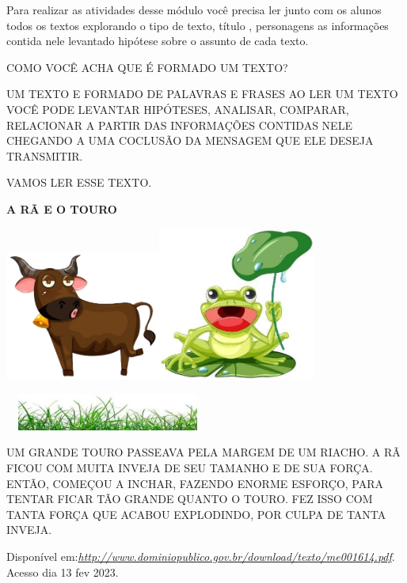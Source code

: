 \begin{escola}
Para realizar as atividades desse módulo você precisa ler junto com os
alunos todos os textos explorando o tipo de texto, título , personagens
as informações contida nele levantado hipótese sobre o assunto de cada
texto.

COMO VOCÊ ACHA QUE É FORMADO UM TEXTO?

UM TEXTO E FORMADO DE PALAVRAS E FRASES AO LER UM TEXTO VOCÊ PODE
LEVANTAR HIPÓTESES, ANALISAR, COMPARAR, RELACIONAR A PARTIR DAS
INFORMAÇÕES CONTIDAS NELE CHEGANDO A UMA COCLUSÃO DA MENSAGEM QUE ELE
DESEJA TRANSMITIR.

VAMOS LER ESSE TEXTO.

\textbf{A RÃ E O TOURO}

\includegraphics[width=2.01214in,height=1.68750in]{media/image160.png}\includegraphics[width=2.04167in,height=1.99274in]{media/image161.jpg}

\includegraphics[width=2.66528in,height=0.47292in]{media/image162.jpg}

UM GRANDE TOURO PASSEAVA PELA MARGEM DE UM RIACHO. A RÃ FICOU COM MUITA
INVEJA DE SEU TAMANHO E DE SUA FORÇA. ENTÃO, COMEÇOU A INCHAR, FAZENDO
ENORME ESFORÇO, PARA TENTAR FICAR TÃO GRANDE QUANTO O TOURO. FEZ ISSO
COM TANTA FORÇA QUE ACABOU EXPLODINDO, POR CULPA DE TANTA INVEJA.

Disponível
em:\href{http://www.dominiopublico.gov.br/download/texto/me001614.pdf}{\emph{http://www.dominiopublico.gov.br/download/texto/me001614.pdf}}.
Acesso dia 13 fev 2023.


\end{escola}
